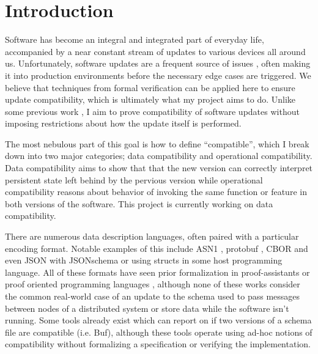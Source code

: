 \section{Introduction}

Software has become an integral and integrated part of everyday life, accompanied
by a near constant stream of updates to various devices all around
us. Unfortunately, software updates are a frequent source of issues
\autocites{zhangUnderstandingDetectingSoftware2021}[][]{Gray1986WhyDC}, often
making it into production environments before the necessary edge cases are
triggered. We believe that techniques from formal verification can be applied
here to ensure update compatibility, which is ultimately what my project aims to
do. Unlike some previous work
\autocites{ajmaniModularSoftwareUpgrades2006}[][]{reitblattAbstractionsNetworkUpdate2012},
I aim to prove compatibility of software updates without imposing restrictions
about how the update itself is performed.

The most nebulous part of this goal is how to define ``compatible'', which I
break down into two major categories; data compatibility and operational
compatibility. Data compatibility aims to show that that the new version can
correctly interpret persistent state left behind by the pervious version while
operational compatibility reasons about behavior of invoking the same function
or feature in both versions of the software. This project is currently working
on data compatibility.

There are numerous data description languages, often paired with a particular
encoding format. Notable examples of this include ASN1
\cite{ASN1EncodingRules2021}, protobuf \cite{LanguageGuideProto}, CBOR
\cite{birkholzConciseDataDefinition2019,bormannConciseBinaryObject2020} and even
JSON with JSONschema
\cite{wrightJSONSchemaMedia2022,brayJavaScriptObjectNotation2017} or using
structs in some host programming language. All of these formats have seen prior
formalization in proof-assistants or proof oriented programming languages
\cite{habibFindingDataCompatibility2021,ramananandroSecureParsingSerializing2025,yeVerifiedProtocolBuffer2019,niASN1ProvablyCorrect2023},
although none of these works consider the common real-world case of an update to
the schema used to pass messages between nodes of a distributed system or store
data while the software isn't running. Some tools already exist which can report
on if two versions of a schema file are compatible (i.e. Buf), although these
tools operate using ad-hoc notions of compatibility without formalizing a
specification or verifying the implementation.


